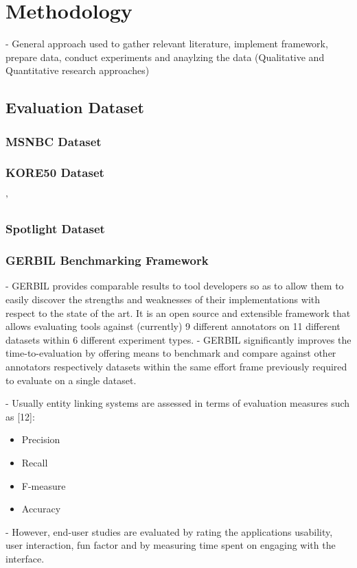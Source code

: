 \chapter{Methodology}
\label{chap:methodology}

- General approach used to gather relevant literature, implement framework, prepare data, conduct experiments and anaylzing the data (Qualitative and Quantitative research approaches)

\section{Evaluation Dataset}
\subsection{MSNBC Dataset}
\subsection{KORE50 Dataset}
'
\subsection{Spotlight Dataset}

\subsection{GERBIL Benchmarking Framework}

- GERBIL provides comparable results to tool developers so as to allow them to easily discover the strengths and weaknesses of their implementations with respect to the state of the art. It is an open source and extensible framework that allows evaluating tools against (currently) 9 different annotators on 11 different datasets within 6 different experiment types. 
- GERBIL significantly improves the time-to-evaluation by offering means to benchmark and compare against other annotators respectively datasets within the same effort frame previously required to evaluate on a single dataset.

- Usually entity linking systems are assessed in terms of evaluation measures such as [12]:
\begin{itemize}
    \item Precision
    \item Recall
    \item F-measure
    \item Accuracy
\end{itemize}
- However, end-user studies are evaluated by rating the applications usability, user interaction, fun factor and by measuring time spent on engaging with the interface. 


